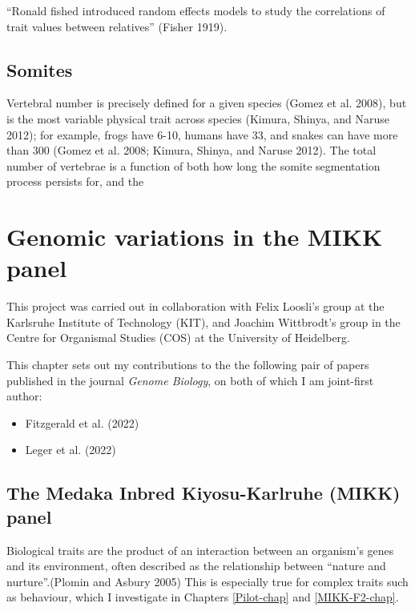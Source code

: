 \documentclass[
]{book}
\begin{document}
``Ronald fished introduced random effects models to study the correlations of trait values between relatives'' (Fisher 1919).

\hypertarget{somites}{%
\section{Somites}\label{somites}}

Vertebral number is precisely defined for a given species (Gomez et al. 2008), but is the most variable physical trait across species (Kimura, Shinya, and Naruse 2012); for example, frogs have 6-10, humans have 33, and snakes can have more than 300 (Gomez et al. 2008; Kimura, Shinya, and Naruse 2012). The total number of vertebrae is a function of both how long the somite segmentation process persists for, and the

\hypertarget{MIKK-genomes-chap}{%
\chapter{Genomic variations in the MIKK panel}\label{MIKK-genomes-chap}}

This project was carried out in collaboration with Felix Loosli's group at the Karlsruhe Institute of Technology (KIT), and Joachim Wittbrodt's group in the Centre for Organismal Studies (COS) at the University of Heidelberg.

This chapter sets out my contributions to the the following pair of papers published in the journal \emph{Genome Biology}, on both of which I am joint-first author:

\begin{itemize}
\item
  Fitzgerald et al. (2022)
\item
  Leger et al. (2022)
\end{itemize}

\hypertarget{the-medaka-inbred-kiyosu-karlruhe-mikk-panel}{%
\section{The Medaka Inbred Kiyosu-Karlruhe (MIKK) panel}\label{the-medaka-inbred-kiyosu-karlruhe-mikk-panel}}

Biological traits are the product of an interaction between an organism's genes and its environment, often described as the relationship between ``nature and nurture''.(Plomin and Asbury 2005) This is especially true for complex traits such as behaviour, which I investigate in Chapters \ref{Pilot-chap} and \ref{MIKK-F2-chap}.
\end{document}
